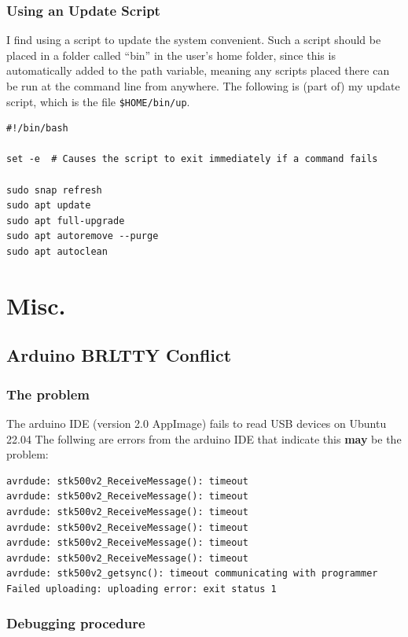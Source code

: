 \documentclass[a4paper, 12pt]{article}
\begin{document}
\subsubsection{Using an Update Script}
I find using a script to update the system convenient. Such a script should be placed in a folder called
``bin'' in the user's home folder, since this is automatically added to the path variable, meaning any
scripts placed there can be run at the command line from anywhere. The following is (part of) my update script,
which is the file \texttt{\$HOME/bin/up}.

\begin{lstlisting}
#!/bin/bash

set -e  # Causes the script to exit immediately if a command fails

sudo snap refresh
sudo apt update
sudo apt full-upgrade
sudo apt autoremove --purge
sudo apt autoclean

\end{lstlisting}

\section{Misc.}

\subsection{Arduino BRLTTY Conflict}

\subsubsection{The problem}

The arduino IDE (version 2.0 AppImage) fails to read USB devices on Ubuntu 22.04
The follwing are errors from the arduino IDE that indicate this \textbf{may} be
the problem:

\begin{lstlisting}
avrdude: stk500v2_ReceiveMessage(): timeout
avrdude: stk500v2_ReceiveMessage(): timeout
avrdude: stk500v2_ReceiveMessage(): timeout
avrdude: stk500v2_ReceiveMessage(): timeout
avrdude: stk500v2_ReceiveMessage(): timeout
avrdude: stk500v2_ReceiveMessage(): timeout
avrdude: stk500v2_getsync(): timeout communicating with programmer
Failed uploading: uploading error: exit status 1
\end{lstlisting}

\subsubsection{Debugging procedure}
\end{document}
